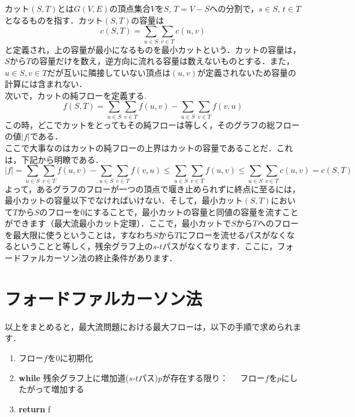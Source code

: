 \documentclass[
]{ltjarticle}
\begin{document}
カット\((S,T)\)とは\(G(V,E)\)の頂点集合\(V\)を\(S\),
\(T = V-S\)への分割で，\(s\in S\),
\(t\in T\)となるものを指す．カット\((S,T)\)の容量は
\[c(S,T) = \sum_{u\in S}\sum_{v\in T}c(u,v)\]
と定義され，上の容量が最小になるものを最小カットという．カットの容量は，\(S\)から\(T\)の容量だけを数え，逆方向に流れる容量は数えないものとする．また，\(u\in S, v \in T\)だが互いに隣接していない頂点は\((u, v)\)が定義されないため容量の計算には含まれない．\\
次いで，カットの純フローを定義する.
\[f(S,T) = \sum_{u\in S} \sum _{v \in T} f(u,v) - \sum_{u \in S} \sum _ {v \in T} f(v, u)\]
この時，どこでカットをとってもその純フローは等しく，そのグラフの総フローの値\(|f|\)である．\\
ここで大事なのはカットの純フローの上界はカットの容量であることだ．これは，下記から明瞭である．
\[|f| = \sum_{u\in S} \sum _{v \in T} f(u,v) - \sum_{u \in S} \sum _ {v \in T} f(v, u)\le\sum_{u\in S} \sum _{v \in T} f(u,v)\le \sum_{u\in S}\sum_{v\in T}c(u,v) = c(S,T)\]
よって，あるグラフのフローが一つの頂点で堰き止められずに終点に至るには，最小カットの容量以下でなければいけない．そして，最小カット\((S, T)\)において\(T\)から\(S\)のフローを0にすることで，最小カットの容量と同値の容量を流すことができます（最大流最小カット定理）．ここで，最小カットで\(S\)から\(T\)へのフローを最大限に使うということは，すなわち\(S\)から\(T\)にフローを流せるパスがなくなるということと等しく，残余グラフ上の\(s\)-\(t\)パスがなくなります．ここに，フォードファルカーソン法の終止条件があります．

\hypertarget{ux30d5ux30a9ux30fcux30c9ux30d5ux30a1ux30ebux30abux30fcux30bdux30f3ux6cd5}{%
\section{フォードファルカーソン法}\label{ux30d5ux30a9ux30fcux30c9ux30d5ux30a1ux30ebux30abux30fcux30bdux30f3ux6cd5}}

以上をまとめると，最大流問題における最大フローは，以下の手順で求められます．\\

\begin{enumerate}
\item フロー$f$を0に初期化
\item \textbf{while} 残余グラフ上に増加道($s$-$t$パス)$p$が存在する限り：\newline
$\;\;\;\;$フロー$f$を$p$にしたがって増加する
\item \textbf{return} f
\end{enumerate}
\end{document}
